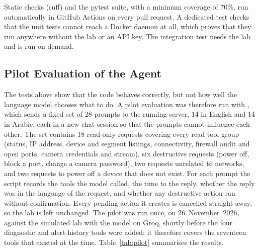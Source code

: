 Static checks (ruff) and the pytest suite, with a minimum coverage of 70\%,
run automatically in GitHub Actions on every pull request. A dedicated test checks that the unit
tests cannot reach a Docker daemon at all, which proves that they run anywhere
without the lab or an API key. The integration test needs the
lab and is run on demand.

\subsection{Pilot Evaluation of the Agent}
\label{sec:pilot}

The tests above show that the code behaves correctly, but not how well the
language model chooses what to do. A pilot evaluation was therefore run with
, which sends a fixed set of 28 prompts to the
running server, 14 in English and 14 in Arabic, each in a new chat session so
that the prompts cannot influence each other. The set contains 18 read-only
requests covering every read tool group (status, IP address, device and
segment listings, connectivity, firewall audit and open ports, camera
credentials and stream), six destructive requests (power off, block a port,
change a camera password), two requests unrelated to networks, and two
requests to power off a device that does not exist. For each prompt the
script records the tools the model called, the time to the reply, whether
the reply was in the language of the request, and whether any destructive
action ran without confirmation. Every pending action it creates is cancelled
straight away, so the lab is left unchanged. The pilot was run once, on
26~November~2026, against the simulated lab with the 
model on Groq, shortly before the four diagnostic and alert-history tools
were added; it therefore covers the seventeen tools that existed at the time.
Table~\ref{tab:pilot} summarises the results.

